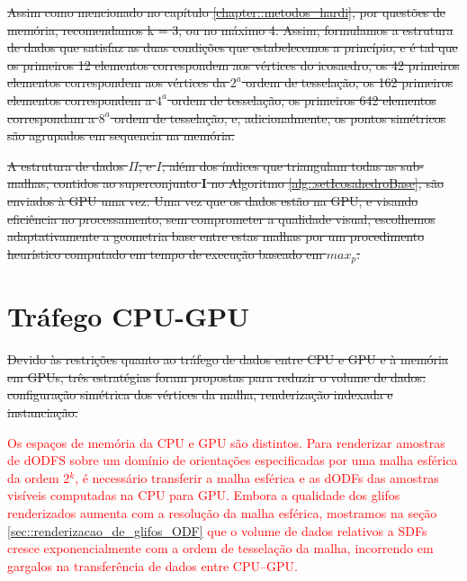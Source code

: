 

\sout{Assim como mencionado no capítulo \ref{chapter::metodos_hardi}, por questões de memória, recomendamos k = 3, ou no máximo 4. Assim, formulamos a estrutura de dados que satisfaz as duas condições que estabelecemos a princípio, e é tal que os primeiros 12 elementos correspondem aos vértices do icosaedro, os 42 primeiros elementos correspondem aos vértices da $2^a$ ordem de tesselação, os 162 primeiros elementos correspondem a $4^a$ ordem de tesselação, os primeiros 642 elementos correspondam a $8^{a}$ ordem de tesselação, e, adicionalmente, os pontos simétricos são agrupados em sequencia na memória.}

\sout{A estrutura de dados $\Pi$, e $I$, além dos índices que triangulam todas as sub-malhas, contidos ao superconjunto $\mathbf{I}$ no Algoritmo \ref{alg::setIcosahedroBase}, são enviados à GPU uma vez. Uma vez que os dados estão na GPU, e visando eficiência no processamento, sem comprometer a qualidade visual, escolhemos adaptativamente a geometria base entre estas malhas por um procedimento heurístico computado em tempo de execução baseado em $max_p$.
}

\section{Tráfego CPU-GPU}

\sout{Devido às restrições quanto ao tráfego de dados entre CPU e GPU e à memória em GPUs, três estratégias foram propostas para reduzir o volume de dados: configuração simétrica dos vértices da malha, renderização indexada e instanciação.}

\textcolor{red}{Os espaços de memória da CPU e GPU são distintos. Para renderizar amostras de dODFS sobre um domínio de orientações especificadas por uma malha esférica da ordem 2$^k$, é necessário transferir a malha esférica e as dODFs das amostras visíveis computadas na CPU para GPU. Embora a qualidade dos glifos renderizados aumenta com a resolução da malha esférica, mostramos na seção \ref{sec::renderizacao_de_glifos_ODF} que o volume de dados relativos a SDFs cresce exponencialmente com a ordem de tesselação da malha, incorrendo em gargalos na transferência de dados entre CPU--GPU.
}

